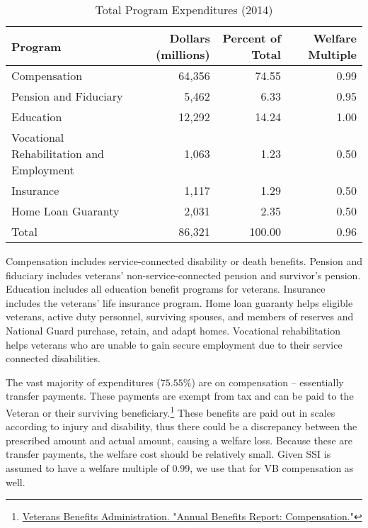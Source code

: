 \documentclass{article}
\begin{document}
\begin{table}[H]
\caption{Total Program Expenditures (2014)}
\begin{center}
\begin{adjustbox}{max width=\textwidth}
\begin{tabular}{lrrr}
\toprule
Program 									&  Dollars (millions) 	& Percent of Total	&	Welfare Multiple 	\\
\midrule
Compensation 								&	64,356				& 74.55				&	0.99				\\		
Pension and Fiduciary 						&	5,462				& 6.33				&	0.95				\\
Education 									&	12,292				& 14.24				&	1.00				\\
Vocational Rehabilitation and Employment 	&	1,063				& 1.23				&	0.50				\\
Insurance									&	1,117				& 1.29				&	0.50				\\
Home Loan Guaranty 							& 	2,031				& 2.35				&	0.50				\\
Total 										& 	86,321				& 100.00			&	0.96				\\
\bottomrule
\end{tabular}
\end{adjustbox}
\end{center}
\end{table}

Compensation includes service-connected disability or death benefits. Pension and fiduciary includes veterans' non-service-connected pension and survivor's pension. Education includes all education benefit programs for veterans. Insurance includes the veterans' life insurance program. Home loan guaranty helps eligible veterans, active duty personnel, surviving spouses, and members of reserves and National Guard purchase, retain, and adapt homes. Vocational rehabilitation helps veterans who are unable to gain secure employment due to their service connected disabilities.

The vast majority of expenditures ($75.55\%$) are on compensation -- essentially transfer payments. These payments are exempt from tax and can be paid to the Veteran or their surviving beneficiary.\footnote{\href{http://www.benefits.va.gov/REPORTS/abr/ABR-Compensation-FY14-10202015.pdf}{Veterans Benefits Administration. "Annual Benefits Report: Compensation."}} These benefits are paid out in scales according to injury and disability, thus there could be a discrepancy between the prescribed amount and actual amount, causing a welfare loss. Because these are transfer payments, the welfare cost should be relatively small. Given SSI is assumed to have a welfare multiple of $0.99$, we use that for VB compensation as well.
\end{document}
